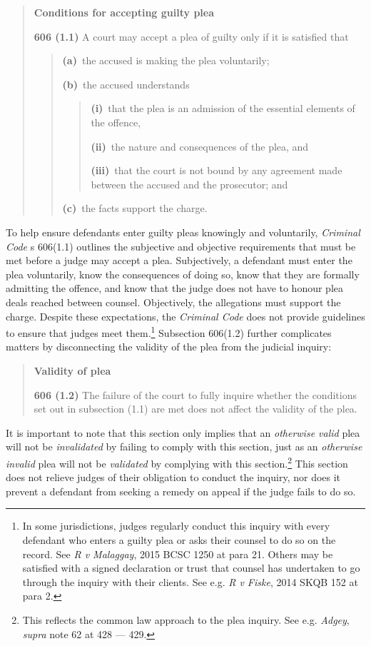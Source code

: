 \break
\begin{quote}
    \singlespacing
    \textbf{Conditions for accepting guilty plea}
    
    \textbf{606 (1.1)} A court may accept a plea of guilty only if it is satisfied that

    \begin{quote}
        \textbf{(a)} the accused is making the plea voluntarily;
        
        \textbf{(b)} the accused understands
        \begin{quote}
            \textbf{(i)} that the plea is an admission of the essential elements of the offence,
            
            \textbf{(ii)} the nature and consequences of the plea, and
            
            \textbf{(iii)} that the court is not bound by any agreement made between the accused and the prosecutor; and   
        \end{quote}
        \textbf{(c)} the facts support the charge.
    \end{quote}

\end{quote}
To help ensure defendants enter guilty pleas knowingly and voluntarily, \textit{Criminal Code} s 606(1.1) outlines the subjective and objective requirements that must be met before a judge may accept a plea. Subjectively, a defendant must enter the plea voluntarily, know the consequences of doing so, know that they are formally admitting the offence, and know that the judge does not have to honour plea deals reached between counsel. Objectively, the allegations must support the charge. Despite these expectations, the \textit{Criminal Code} does not provide guidelines to ensure that judges meet them.\footnote{In some jurisdictions, judges regularly conduct this inquiry with every defendant who enters a guilty plea or asks their counsel to do so on the record. See \textit{R v Malaggay}, 2015 BCSC 1250 at para 21. Others may be satisfied with a signed declaration or trust that counsel has undertaken to go through the inquiry with their clients. See e.g. \textit{R v Fiske}, 2014 SKQB 152 at para 2.} Subsection 606(1.2) further complicates matters by disconnecting the validity of the plea from the judicial inquiry:

\begin{quote}
    \onehalfspacing
    \textbf{Validity of plea}
    
    \textbf{606 (1.2)} The failure of the court to fully inquire whether the conditions set out in subsection (1.1) are met does not affect the validity of the plea.
\end{quote}
It is important to note that this section only implies that an \textit{otherwise valid} plea will not be \textit{invalidated} by failing to comply with this section, just as an \textit{otherwise invalid} plea will not be \textit{validated} by complying with this section.\footnote{This reflects the common law approach to the plea inquiry. See e.g. \textit{Adgey}, \textit{supra} note 62 at 428 — 429.} This section does not relieve judges of their obligation to conduct the inquiry, nor does it prevent a defendant from seeking a remedy on appeal if the judge fails to do so.

